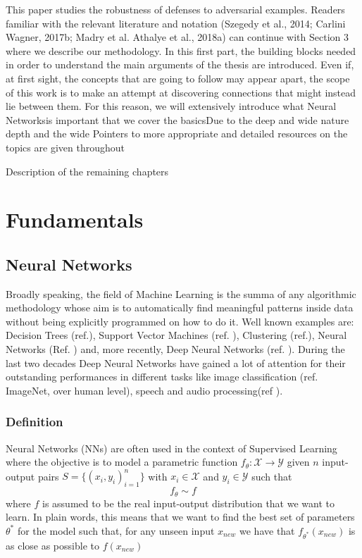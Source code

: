 \documentclass[LaM,binding=0.6cm]{./packages/sapthesis/sapthesis}
\begin{document}
    This paper studies the robustness of defenses to adversarial examples. Readers familiar with the
    relevant literature and notation (Szegedy et al., 2014; Carlini  Wagner, 2017b; Madry et al. Athalye et al., 2018a) can continue with Section 3 where we describe our methodology.
    In this first part, the building blocks needed in order to understand the main arguments of the thesis are introduced. Even if, at first sight, 
    the concepts that are going to follow may appear apart, the scope of this work is to make an attempt at discovering connections that might instead lie between them.     
    For this reason, we will extensively introduce what Neural Networksis important that we cover the basicsDue to the deep and wide nature depth and the wide  
    Pointers to more appropriate and detailed resources on the topics are given throughout
    
    Description of the remaining chapters 

\part{Fundamentals}


\chapter{Neural Networks}

        Broadly speaking, the field of Machine Learning is the summa of any algorithmic methodology whose aim is to automatically find meaningful patterns inside data without
        being explicitly programmed on how to do it. Well known examples are: Decision Trees (ref.), Support Vector Machines (ref. ), Clustering (ref.),
        Neural Networks (Ref. ) and, more recently, 
        Deep Neural Networks (ref. ). During the last two decades Deep Neural Networks have gained a lot of attention for their outstanding performances in different tasks like
        image classification (ref. ImageNet, over human level), speech and audio processing(ref ).

        \section{Definition}
            
            Neural Networks (NNs) are often used in the context of Supervised Learning where the objective is to model a parametric function 
            $ f_{\theta} \colon \mathcal{X} \to \mathcal{Y}$ given $n$ input-output pairs $S = \{(x_i, y_i)_{i=1}^n\} $ with $x_i \in \mathcal{X}$ and $ y_i \in \mathcal{Y}$
            such that
            \begin{equation}
                f_{\theta} \sim f  
            \end{equation}
            where $f$ is assumed to be the real input-output distribution that we want to learn. In plain words, this means that we want to find the best set of parameters $\theta^{*}$ for the model
            such that, for any unseen input $x_{new}$ we have that $f_{\theta^*}\left(x_{new}\right)$ is as close as possible to $f\left(x_{new}\right)$
\end{document}
